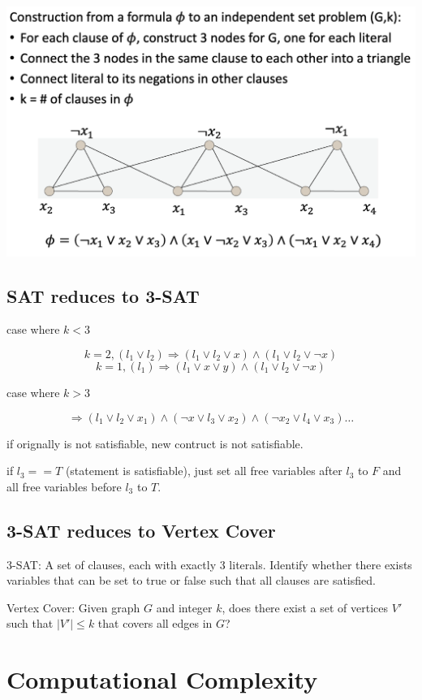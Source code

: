 \documentclass[12pt,a4paper]{article}
\begin{document}
\includegraphics[width=\textwidth]{./images/3sat_reduce_to_is.png}

\subsection*{SAT reduces to 3-SAT}

case where $k<3$

\[k = 2, (l_1 \lor l_2) \Rightarrow (l_1 \lor l_2 \lor x) \land (l_1 \lor l_2 \lor \neg x)\]
\[k = 1, (l_1) \Rightarrow (l_1 \lor x \lor y) \land (l_1 \lor l_2 \lor \neg x)\]

case where $ k>3$

\[ \Rightarrow (l_1 \lor l_2 \lor x_1) \land (\neg x \lor l_3 \lor x_2) \land (\neg x_2 \lor l_4 \lor x_3)\dots\]

if orignally is not satisfiable, new contruct is not satisfiable.

if $l_3 == T$ (statement is satisfiable), just set all free variables after $l_3$ to $F$ and all free variables before $l_3$ to $T$.

\subsection*{3-SAT reduces to Vertex Cover}

3-SAT: A set of clauses, each with exactly 3 literals. Identify whether there exists variables that can be set to true or false such that all clauses are satisfied.

Vertex Cover: Given graph $G$ and integer $k$, does there exist a set of vertices $V'$ such that $|V'| \leq k$ that covers all edges in $G$? 

\section*{Computational Complexity}
\end{document}

